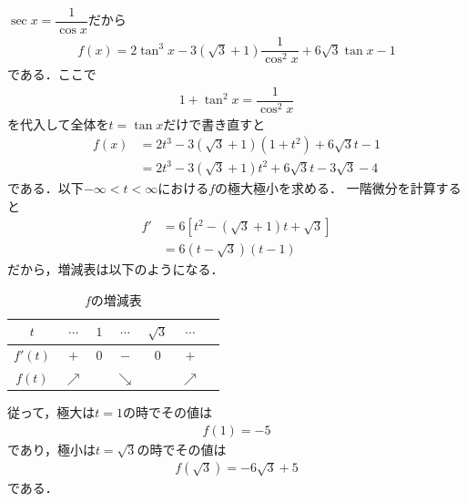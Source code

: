 \documentclass[../../main.tex]{subfiles}
\begin{document}
\begin{oframed}
  
\end{oframed}

$\sec x= \dfrac{1}{\cos x}$だから
\begin{align}
  f(x) = 2\tan^3 x -3\left(\sqrt{3}+1\right)\dfrac{1}{\cos^2 x} + 6\sqrt{3}\tan x - 1
\end{align}
である．ここで
\begin{align}
  1+\tan^2 x = \dfrac{1}{\cos^2 x}
\end{align}
を代入して全体を$t = \tan x$だけで書き直すと
\begin{align}
  f(x)
  &= 2t^3  -3\left(\sqrt{3}+1\right)(1+t^2) + 6\sqrt{3}t - 1 \\
  &= 2t^3  -3\left(\sqrt{3}+1\right)t^2 + 6\sqrt{3}t - 3\sqrt{3} - 4
\end{align}
である．以下$-\infty < t < \infty$における$f$の極大極小を求める．
一階微分を計算すると
\begin{align}
  f'
  &= 6\left[t^2 - \left(\sqrt{3}+1\right)t + \sqrt{3}\right] \\
  &= 6\left(t-\sqrt{3}\right)\left(t-1\right)
\end{align}
だから，増減表は以下のようになる．

\begin{table}[htb]
  \centering
  \caption{$f$の増減表}
  \begin{tabular}{c|c*5{c}}
    $t$ & $\cdots$ & $1$ & $\cdots$ & $\sqrt{3}$ & $\cdots$ \\ \hline
    $f'(t)$ & $+$ & $0$ & $-$ & $0$ & $+$ \\ \hline
    $f(t)$ & $\nearrow$ &   & $\searrow$ &  & $\nearrow$
  \end{tabular}
\end{table}

従って，極大は$t=1$の時でその値は
\begin{align}
  f\left(1\right) = -5
\end{align}
であり，極小は$t=\sqrt{3}$の時でその値は
\begin{align}
  f\left(\sqrt{3}\right) = -6\sqrt{3} + 5
\end{align}
である．

\newpage
\end{document}

